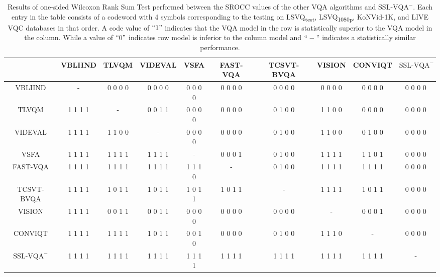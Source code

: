 \documentclass[10pt,twocolumn,letterpaper]{article}
\begin{document}
\begin{table}[]
\begin{adjustbox}{max width=\textwidth}
\begin{tabular}{c|c|c|c|c|c|c|c|c|c}
\hline
                       & VBLIIND & TLVQM   & VIDEVAL & VSFA    & FAST-VQA & TCSVT-BVQA & VISION  & CONVIQT & $\textrm{SSL-VQA}^{-}$ \\ \hline
VBLIIND                & -       & 0 0 0 0 & 0 0 0 0 & 0 0 0 0 & 0 0 0 0  & 0 0 0 0    & 0 0 0 0 & 0 0 0 0 & 0 0 0 0                \\ \hline
TLVQM                  & 1 1 1 1 & -       & 0 0 1 1 & 0 0 0 0 & 0 0 0 0  & 0 1 0 0    & 1 1 0 0 & 0 0 0 0 & 0 0 0 0                \\ \hline
VIDEVAL                & 1 1 1 1 & 1 1 0 0 & -       & 0 0 0 0 & 0 0 0 0  & 0 1 0 0    & 1 1 0 0 & 0 1 0 0 & 0 0 0 0                \\ \hline
VSFA                   & 1 1 1 1 & 1 1 1 1 & 1 1 1 1 & -       & 0 0 0 1  & 0 1 0 0    & 1 1 1 1 & 1 1 0 1 & 0 0 0 0                \\ \hline
FAST-VQA               & 1 1 1 1 & 1 1 1 1 & 1 1 1 1 & 1 1 1 0 & -        & 0 1 0 0    & 1 1 1 1 & 1 1 1 1 & 0 0 0 0                \\ \hline
TCSVT-BVQA             & 1 1 1 1 & 1 0 1 1 & 1 0 1 1 & 1 0 1 1 & 1 0 1 1  & -          & 1 1 1 1 & 1 0 1 1 & 0 0 0 0                \\ \hline
VISION                 & 1 1 1 1 & 0 0 1 1 & 0 0 1 1 & 0 0 0 0 & 0 0 0 0  & 0 0 0 0    & -       & 0 0 0 1 & 0 0 0 0                \\ \hline
CONVIQT                & 1 1 1 1 & 1 1 1 1 & 1 0 1 1 & 0 0 1 0 & 0 0 0 0  & 0 1 0 0    & 1 1 1 0 & -       & 0 0 0 0                \\ \hline
$\textrm{SSL-VQA}^{-}$ & 1 1 1 1 & 1 1 1 1 & 1 1 1 1 & 1 1 1 1 & 1 1 1 1  & 1 1 1 1    & 1 1 1 1 & 1 1 1 1 & -                      \\ \hline
\end{tabular}
\end{adjustbox}
\caption{Results of one-sided Wilcoxon Rank Sum Test performed between the SROCC values of the other VQA algorithms and $\textrm{SSL-VQA}^{-}$. Each entry in the table consists of a codeword with 4 symbols corresponding to the testing on LSVQ\textsubscript{test}, LSVQ\textsubscript{1080p}, KoNVid-1K, and LIVE VQC databases in that order. A code value of $``1"$ indicates that the VQA model in the row
is statistically superior to the VQA model in the column. While a value of $``0"$ indicates row model is inferior to the column
model and  $``-"$ indicates a statistically similar performance.}
\label{sig_fewshot}
\end{table}
\end{document}
